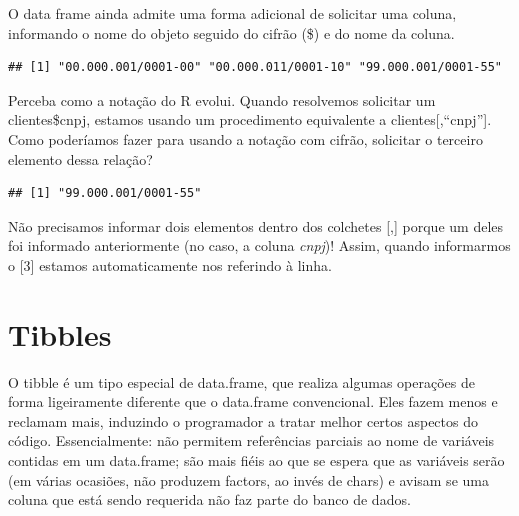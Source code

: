 \documentclass[
]{book}
\newenvironment{Shaded}{\begin{snugshade}}{\end{snugshade}}
\newcommand{\DecValTok}[1]{\textcolor[rgb]{0.00,0.00,0.81}{#1}}
\newcommand{\NormalTok}[1]{#1}
\newcommand{\SpecialCharTok}[1]{\textcolor[rgb]{0.00,0.00,0.00}{#1}}
\begin{document}
O data frame ainda admite uma forma adicional de solicitar uma coluna, informando o nome do objeto seguido do cifrão (\$) e do nome da coluna.

\begin{Shaded}
\end{Shaded}

\begin{verbatim}
## [1] "00.000.001/0001-00" "00.000.011/0001-10" "99.000.001/0001-55"
\end{verbatim}

Perceba como a notação do R evolui. Quando resolvemos solicitar um clientes\$cnpj, estamos usando um procedimento equivalente a clientes{[},``cnpj''{]}. Como poderíamos fazer para usando a notação com cifrão, solicitar o terceiro elemento dessa relação?

\begin{Shaded}
\end{Shaded}

\begin{verbatim}
## [1] "99.000.001/0001-55"
\end{verbatim}

Não precisamos informar dois elementos dentro dos colchetes {[},{]} porque um deles foi informado anteriormente (no caso, a coluna \emph{cnpj})! Assim, quando informarmos o {[}3{]} estamos automaticamente nos referindo à linha.

\hypertarget{tibbles}{%
\section{Tibbles}\label{tibbles}}

O tibble é um tipo especial de data.frame, que realiza algumas operações de forma ligeiramente diferente que o data.frame convencional. Eles fazem menos e reclamam mais, induzindo o programador a tratar melhor certos aspectos do código. Essencialmente: não permitem referências parciais ao nome de variáveis contidas em um data.frame; são mais fiéis ao que se espera que as variáveis serão (em várias ocasiões, não produzem factors, ao invés de chars) e avisam se uma coluna que está sendo requerida não faz parte do banco de dados.
\end{document}
